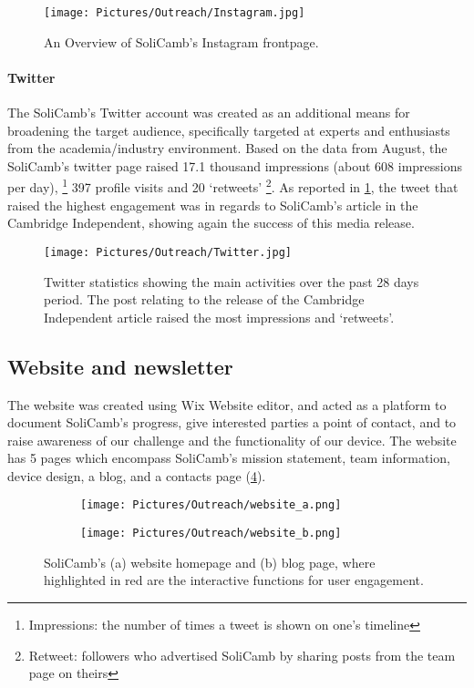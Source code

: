 \begin{figure}[h!]
    	\centering
    	\texttt{[image: Pictures/Outreach/Instagram.jpg]}
    	\captionsetup{justification = centering}
    	\caption{An Overview of SoliCamb's Instagram frontpage.}
    	  \end{figure}

\paragraph{Twitter} 
The SoliCamb's Twitter account was created as an additional means for broadening the target audience, specifically targeted at experts and enthusiasts from the academia/industry environment. Based on the data from August, the SoliCamb's twitter page raised 17.1 thousand impressions (about 608 impressions per day), \footnote{Impressions: the number of times a tweet is shown on one's timeline} 397 profile visits and 20 `retweets' \footnote{Retweet: followers who advertised SoliCamb by sharing posts from the team page on theirs}. As reported in \cref{fig:Twitter}, the tweet that raised the highest engagement was in regards to SoliCamb's article in the Cambridge Independent, showing again the success of this media release. 

  \begin{figure}[ht]
    	\centering
    	\texttt{[image: Pictures/Outreach/Twitter.jpg]}
    	\captionsetup{justification = centering}
    	\caption{Twitter statistics showing the main activities over the past 28 days period. The post relating to the release of the Cambridge Independent article raised the most impressions and `retweets'.}
    	\label{fig:Twitter}
     \end{figure}
  
    \subsection{Website and newsletter}
        The website was created using Wix Website editor, and acted as a platform to document SoliCamb's progress, give interested parties a point of contact, and to raise awareness of our challenge and the functionality of our device. The website has 5 pages which encompass SoliCamb's mission statement, team information, device design, a blog, and a contacts page (\cref{fig:website}). 
        
        \begin{figure}[h!]
	\centering
	\begin{subfigure}[b]{0.45\linewidth} 
		\centering
		\texttt{[image: Pictures/Outreach/website\_a.png]}
		\caption{}
		\label{subfig:website_a}
	\end{subfigure}
	\begin{subfigure}[b]{0.45\linewidth}
	\centering
		\texttt{[image: Pictures/Outreach/website\_b.png]}
		\caption{}
		\label{subfig:website_b}
	\end{subfigure}
	\captionsetup{justification = centering}
	\caption{SoliCamb's (a) website homepage and (b) blog page, where highlighted in red are the interactive functions for user engagement.}
	\label{fig:website}
\end{figure}   	

